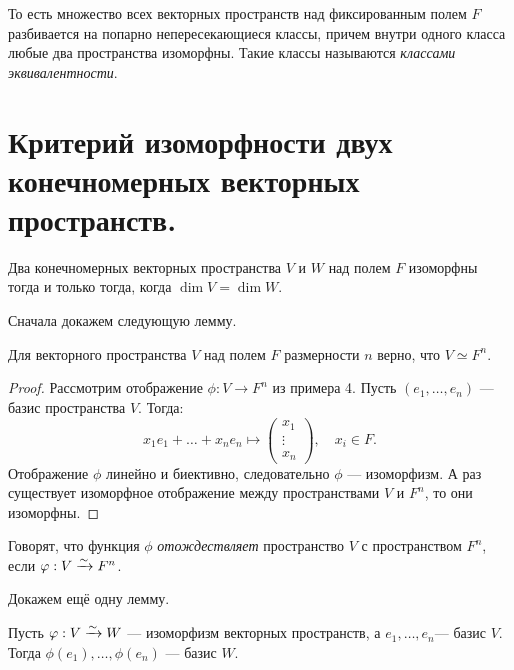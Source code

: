 То есть множество всех векторных пространств над фиксированным полем $F$ разбивается на попарно непересекающиеся классы, причем внутри одного класса любые два пространства изоморфны. Такие классы называются \textit{классами эквивалентности}.

\section{Критерий изоморфности двух конечномерных векторных пространств.}

\begin{Theorem}
Два конечномерных векторных пространства $V$ и $W$ над полем $F$ изоморфны тогда и только тогда, когда $\dim V = \dim W$.
\end{Theorem}

Сначала докажем следующую лемму.

\begin{Lemma}[1]
Для векторного пространства $V$ над полем $F$ размерности $n$ верно, что $V \simeq F^n$.
\end{Lemma}
\begin{proof}
Рассмотрим отображение $\phi: V \rightarrow F^n$ из примера 4. Пусть $(e_1, \ldots, e_n)$ --- базис пространства $V$. Тогда:
\[
x_1e_1 + \ldots + x_ne_n \mapsto 
\begin{pmatrix*}
x_1 \\
\vdots \\
x_n
\end{pmatrix*}, \quad x_i \in F.
\]
Отображение $\phi$ линейно и биективно, следовательно $\phi$ --- изоморфизм. А раз существует изоморфное отображение между пространствами $V$ и $F^n$, то они изоморфны.
\end{proof}

\begin{Comment}
Говорят, что функция $\phi$ \textit{отождествляет} пространство $V$ с пространством $F^n$, если $\varphi: V \xrightarrow{\sim} F^n$.
\end{Comment}

Докажем ещё одну лемму.
\begin{Lemma}[2]
Пусть $\varphi: V \xrightarrow{\sim} W$ --- изоморфизм векторных пространств, а $e_1, \ldots, e_n$--- базис $V$. Тогда $\phi(e_1), \ldots, \phi(e_n)$ --- базис $W$.
\end{Lemma}

